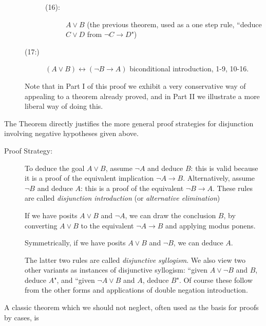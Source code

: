 \documentclass[12pt]{book}
\begin{document}
\begin{description}
\begin{description}
\begin{description}
\item[(16):]  $A \vee B$ (the previous theorem, used as a one step rule, ``deduce $C \vee D$ from $\neg C \rightarrow D$")

\end{description}

\item[(17:)]  $(A \vee B) \leftrightarrow (\neg B \rightarrow A)$ biconditional introduction, 1-9, 10-16.

\end{description}

Note that in Part I of this proof we exhibit a very conservative way of appealing to a theorem already proved, and in Part II we illustrate a more liberal way of doing this.


\newpage

\end{description}

\newpage

The Theorem directly justifies the more general proof strategies for
disjunction involving negative hypotheses given above.

\begin{description}


\item[Proof Strategy:]

To deduce the goal $A \vee B$, assume $\neg A$ and deduce $B$: this is
valid because it is a proof of the equivalent implication $\neg A
\rightarrow B$.  Alternatively, assume $\neg B$ and deduce $A$: this
is a proof of the equivalent $\neg B \rightarrow A$.  These rules are called {\em disjunction introduction\/} (or {\em alternative elimination\/})

If we have posits $A \vee B$ and $\neg A$, we can draw the conclusion $B$, by
converting $A \vee B$ to the equivalent $\neg A \rightarrow B$ and
applying modus ponens.

Symmetrically, if we have posits $A \vee B$ and $\neg B$, we can deduce
$A$.

The latter two rules are called {\em disjunctive syllogism\/}.  We also view two other variants as instances of disjunctive syllogism:  ``given $A \vee \neg B$ and $B$, deduce $A$", and ``given $\neg A \vee B$ and $A$, deduce $B$".  Of course these follow from the other forms and applications of double negation introduction.

\end{description}

A classic theorem which we should  not neglect, often used as the basis for proofs by cases, is 
\end{document}
